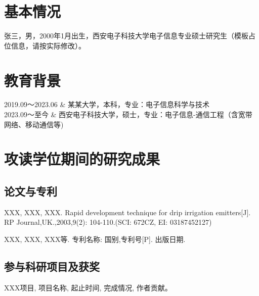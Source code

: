 
\setcounter{section}{0}
\section{基本情况}
张三，男，2000年1月出生，西安电子科技大学电子信息专业硕士研究生（模板占位信息，请按实际修改）。

\section{教育背景}
\begin{edubg}
  2019.09～2023.06 & 某某大学，本科，专业：电子信息科学与技术 \\
  2023.09～至今 & 西安电子科技大学，硕士，专业：电子信息-通信工程（含宽带网络、移动通信等) \\
\end{edubg}

\section{攻读学位期间的研究成果}
\subsection{论文与专利}
\begin{resresult}
  \item XXX, XXX, XXX. Rapid development technique for drip irrigation emitters[J]. RP Journal,UK.,2003,9(2): 104-110.(SCI: 672CZ, EI: 03187452127)
  \item XXX, XXX, XXX等. 专利名称: 国别,专利号[P]. 出版日期.
\end{resresult}

\subsection{参与科研项目及获奖}
\begin{resresult}
  \item XXX项目, 项目名称, 起止时间, 完成情况, 作者贡献。
\end{resresult}
